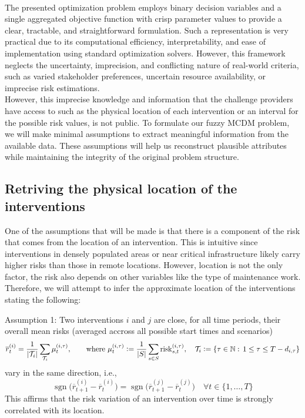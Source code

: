 \\
The presented optimization problem employs binary decision variables and a single aggregated objective function with crisp parameter values to provide a clear, tractable, and straightforward formulation. Such a representation is very practical due to its computational efficiency, interpretability, and ease of implementation using standard optimization solvers. However, this framework neglects the uncertainty, imprecision, and conflicting nature of  real-world criteria, such as varied stakeholder preferences, uncertain resource availability, or imprecise risk estimations. \\

However, this imprecise knowledge and information that the challenge providers have access to such as the physical location of each intervention or an interval for the possible risk values, is not public. To formulate our fuzzy MCDM problem, we will make minimal assumptions to extract meaningful information from the available data. These assumptions will help us reconstruct plausible attributes while maintaining the integrity of the original problem structure.\\


\subsection{Retriving the physical location of the interventions}
One of the assumptions that will be made is that there is a component of the risk that comes from the location of an intervention. This is intuitive since interventions in densely populated areas or near critical infrastructure likely carry higher risks than those in remote locations. However, location is not the only factor, the risk also depends on other variables like the type of maintenance work. \\

Therefore, we will attempt to infer the approximate location of the interventions stating the following:
\begin{notation}{Assumption 1:}
    Two interventions \(i\) and \(j\) are close, for all time periods, their overall mean risks (averaged accross all possible start times and scenarios)
    \[
    \overline{r}_t^{(i)} = \frac{1}{\left|\mathcal{T}_i\right|}\sum_{\mathcal{T}_i}\mu_t^{(i,\tau)}, 
    \qquad \text{where }\mu_t^{(i,\tau)} \mathrel{\mathop:}= \frac{1}{|S|}\sum_{s\in S} \mathrm{risk}_{s,t}^{(i,\tau)}, \quad
    \mathcal{T}_i\mathrel{\mathop:}= \{\tau\in \mathbb{N}:\,1\leq \tau \leq T-d_{i,\tau}\}
    \]
    vary in the same direction, i.e.,
    \[
    \operatorname{sgn}\Big(\overline{r}_{t+1}^{(i)}-\overline{r}_t^{(i)}\Big)=\operatorname{sgn}\Big(\overline{r}_{t+1}^{(j)}-\overline{r}_t^{(j)}\Big)\quad\forall t\in\{1,\dots , T\}
    \]
    This affirms that the risk variation of an intervention over time is strongly correlated with its location.
    \end{notation}


